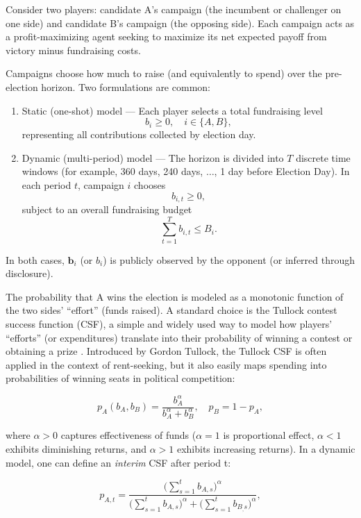Consider two players: candidate A's campaign (the incumbent or challenger on one side) and candidate B's campaign (the opposing side). Each campaign acts as a profit-maximizing agent seeking to maximize its net expected payoff from victory minus fundraising costs.

Campaigns choose how much to raise (and equivalently to spend) over the pre-election horizon. Two formulations are common:

\begin{enumerate}
	\item Static (one-shot) model --- Each player selects a total fundraising level
		\[ b_i \geq 0, \hspace{1em} i \in \{A, B\}, \]
		representing all contributions collected by election day.
	\item Dynamic (multi-period) model --- The horizon is divided into $T$ discrete time windows (for example, 360 days, 240 days, $\ldots$, 1 day before Election Day). In each period $t$, campaign $i$ chooses
		\[ b_{i,t} \geq 0, \]
		subject to an overall fundraising budget
		\[ \sum\limits_{t=1}^T b_{i,t} \leq B_i. \]
\end{enumerate}

\noindent In both cases, $\mathbf{b}_i$ (or $b_i$) is publicly observed by the opponent (or inferred through disclosure).

The probability that A wins the election is modeled as a monotonic function of the two sides' ``effort'' (funds raised). A standard choice is the Tullock contest success function (CSF), a simple and widely used way to model how players' ``efforts'' (or expenditures) translate into their probability of winning a contest or obtaining a prize \cite{tullock1980}. Introduced by Gordon Tullock, the Tullock CSF is often applied in the context of rent-seeking, but it also easily maps spending into probabilities of winning seats in political competition:

\[ p_A (b_A, b_B) = \dfrac{b_A^\alpha}{b_A^\alpha + b_B^\alpha}, \hspace{1em} p_B = 1 - p_A, \]

\noindent where $\alpha > 0$ captures effectiveness of funds ($\alpha = 1$ is proportional effect, $\alpha < 1$ exhibits diminishing returns, and $\alpha > 1$ exhibits increasing returns). In a dynamic model, one can define an \textit{interim} CSF after period t: 

\[ p_{A,t} = \dfrac{\Bigg(\sum\limits_{s=1}^t b_{A,s} \Bigg)^\alpha}{\Bigg(\sum\limits_{s=1}^t b_{A,s} \Bigg)^\alpha + \Bigg(\sum\limits_{s=1}^t b_{B_,s} \Bigg)^\alpha}, \]

